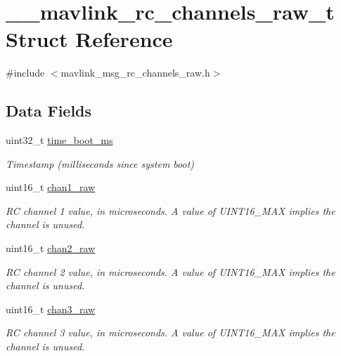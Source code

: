 \hypertarget{struct____mavlink__rc__channels__raw__t}{\section{\+\_\+\+\_\+mavlink\+\_\+rc\+\_\+channels\+\_\+raw\+\_\+t Struct Reference}
\label{struct____mavlink__rc__channels__raw__t}
}


{\ttfamily \#include $<$mavlink\+\_\+msg\+\_\+rc\+\_\+channels\+\_\+raw.\+h$>$}

\subsection*{Data Fields}
\begin{DoxyCompactItemize}
\item 
uint32\+\_\+t \hyperlink{struct____mavlink__rc__channels__raw__t_aceced8c76bb7171ce4f03c0b633f7a5f}{time\+\_\+boot\+\_\+ms}
\begin{DoxyCompactList}\small\item\em Timestamp (milliseconds since system boot) \end{DoxyCompactList}\item 
uint16\+\_\+t \hyperlink{struct____mavlink__rc__channels__raw__t_a61bd698c061cfaa1da0b02d3ee390f4e}{chan1\+\_\+raw}
\begin{DoxyCompactList}\small\item\em R\+C channel 1 value, in microseconds. A value of U\+I\+N\+T16\+\_\+\+M\+A\+X implies the channel is unused. \end{DoxyCompactList}\item 
uint16\+\_\+t \hyperlink{struct____mavlink__rc__channels__raw__t_a87484f764dc99860781a6a29a07f9a7a}{chan2\+\_\+raw}
\begin{DoxyCompactList}\small\item\em R\+C channel 2 value, in microseconds. A value of U\+I\+N\+T16\+\_\+\+M\+A\+X implies the channel is unused. \end{DoxyCompactList}\item 
uint16\+\_\+t \hyperlink{struct____mavlink__rc__channels__raw__t_af56e588a0dcc66fbf2fdb61b5995060c}{chan3\+\_\+raw}
\begin{DoxyCompactList}\small\item\em R\+C channel 3 value, in microseconds. A value of U\+I\+N\+T16\+\_\+\+M\+A\+X implies the channel is unused. \end{DoxyCompactList}\item 

\end{DoxyCompactItemize}
